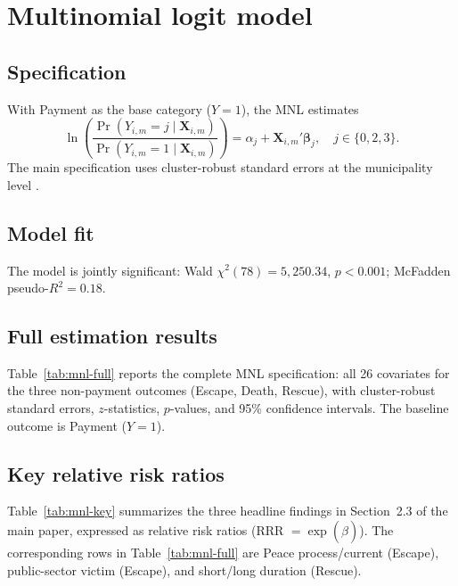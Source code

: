 \documentclass[12pt]{article}
\numberwithin{equation}{section}
\numberwithin{table}{section}
\begin{document}
\section{Multinomial logit model}
\label{sec:mnl}

\subsection{Specification}

With Payment as the base category ($Y=1$), the MNL estimates
\begin{equation}
\ln\!\left(\frac{\Pr(Y_{i,m}=j \mid \mathbf{X}_{i,m})}{\Pr(Y_{i,m}=1 \mid \mathbf{X}_{i,m})}\right)
= \alpha_j + \mathbf{X}_{i,m}'\boldsymbol{\beta}_j,
\quad j\in\{0,2,3\}.
\label{eq:mnl-app}
\end{equation}
The main specification uses cluster-robust standard errors at the municipality
level \citep{Wooldridge2010}.

\subsection{Model fit}

The model is jointly significant: Wald $\chi^2(78)=5{,}250.34$, $p<0.001$;
McFadden pseudo-$R^2=0.18$.

\subsection{Full estimation results}

Table~\ref{tab:mnl-full} reports the complete MNL specification: all 26
covariates for the three non-payment outcomes (Escape, Death, Rescue), with
cluster-robust standard errors, $z$-statistics, $p$-values, and 95\%
confidence intervals. The baseline outcome is Payment ($Y=1$).



\subsection{Key relative risk ratios}

Table~\ref{tab:mnl-key} summarizes the three headline findings in Section~2.3
of the main paper, expressed as relative risk ratios (RRR $=\exp(\hat\beta)$).
The corresponding rows in Table~\ref{tab:mnl-full} are Peace process/current
(Escape), public-sector victim (Escape), and short/long duration (Rescue).
\end{document}
